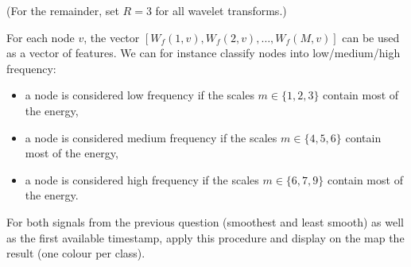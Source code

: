 \documentclass[11pt]{article}
\begin{document}
\newpage
\begin{exercise}
(For the remainder, set $R=3$ for all wavelet transforms.)

For each node $v$, the vector $[W_f(1, v), W_f(2, v),\dots, W_f(M, v)]$ can be used as a vector of features. We can for instance classify nodes into low/medium/high frequency: 
\begin{itemize}
    \item a node is considered low frequency if the scales $m\in\{1,2,3\}$ contain most of the energy,
    \item a node is considered medium frequency if the scales $m\in\{4,5,6\}$ contain most of the energy,
    \item a node is considered high frequency if the scales $m\in\{6,7,9\}$ contain most of the energy.
\end{itemize}


For both signals from the previous question (smoothest and least smooth) as well as the first available timestamp, apply this procedure and display on the map the result (one colour per class).

\end{exercise}
\end{document}
